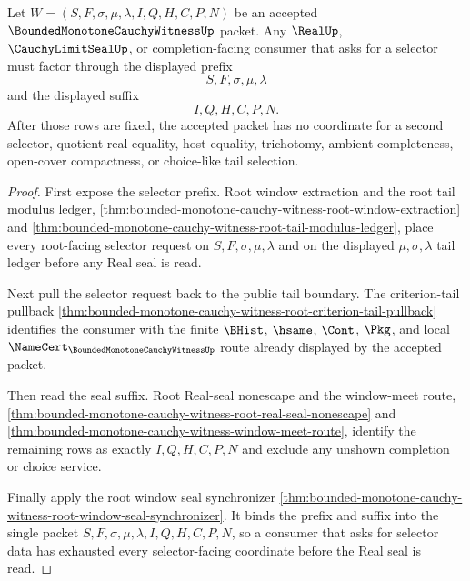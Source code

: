 \begin{theorem}
\label{thm:bounded-monotone-cauchy-witness-real-seal-selector-exhaustion}
Let $W=(S,F,\sigma,\mu,\lambda,I,Q,H,C,P,N)$ be an accepted $\BoundedMonotoneCauchyWitnessUp$ packet. Any $\RealUp$, $\CauchyLimitSealUp$, or completion-facing consumer that asks for a selector must factor through the displayed prefix
$$
S,F,\sigma,\mu,\lambda
$$
and the displayed suffix
$$
I,Q,H,C,P,N.
$$
After those rows are fixed, the accepted packet has no coordinate for a second selector, quotient real equality, host equality, trichotomy, ambient completeness, open-cover compactness, or choice-like tail selection.
\end{theorem}
\begin{proof}
First expose the selector prefix. Root window extraction and the root tail modulus ledger, \autoref{thm:bounded-monotone-cauchy-witness-root-window-extraction} and \autoref{thm:bounded-monotone-cauchy-witness-root-tail-modulus-ledger}, place every root-facing selector request on $S,F,\sigma,\mu,\lambda$ and on the displayed $\mu,\sigma,\lambda$ tail ledger before any Real seal is read.

Next pull the selector request back to the public tail boundary. The criterion-tail pullback \autoref{thm:bounded-monotone-cauchy-witness-root-criterion-tail-pullback} identifies the consumer with the finite $\BHist$, $\hsame$, $\Cont$, $\Pkg$, and local $\NameCert_{\BoundedMonotoneCauchyWitnessUp}$ route already displayed by the accepted packet.

Then read the seal suffix. Root Real-seal nonescape and the window-meet route, \autoref{thm:bounded-monotone-cauchy-witness-root-real-seal-nonescape} and \autoref{thm:bounded-monotone-cauchy-witness-window-meet-route}, identify the remaining rows as exactly $I,Q,H,C,P,N$ and exclude any unshown completion or choice service.

Finally apply the root window seal synchronizer \autoref{thm:bounded-monotone-cauchy-witness-root-window-seal-synchronizer}. It binds the prefix and suffix into the single packet $S,F,\sigma,\mu,\lambda,I,Q,H,C,P,N$, so a consumer that asks for selector data has exhausted every selector-facing coordinate before the Real seal is read.
\end{proof}


